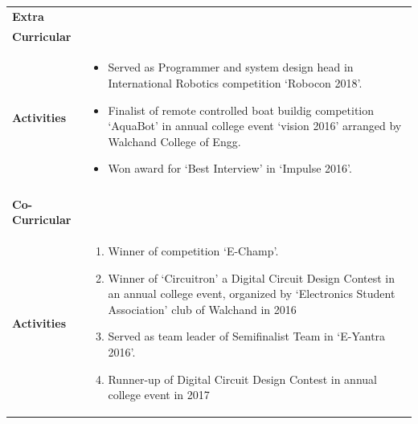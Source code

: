 \documentclass[a4paper,11pt,oneside]{article}
\begin{document}
\begin{tabular}{@{} p{} p{\textwidth}}
     \textbf{\large{Extra}} & \\
     \textbf{\large{Curricular}} & \\
     \textbf{\large{Activities}}
        & \vspace{-4em}
          \begin{itemize}
            \setlength\itemsep{0.1em}
            \item Served as Programmer and system design head in International Robotics competition `Robocon 2018'.
            \item Finalist of remote controlled boat buildig competition `AquaBot' in annual college event `vision 2016' arranged by Walchand College of Engg.
            \item Won award for `Best Interview' in `Impulse 2016'.
        \end{itemize}  \\ \\
     \textbf{\large{Co-Curricular}} & \\
     \textbf{\large{Activities}}
        & \vspace{-3em}
          \begin{enumerate}
            \setlength\itemsep{0.1em}
            \item Winner of  competition `E-Champ'.
            \item Winner of `Circuitron' a Digital Circuit Design Contest in an annual college event, organized by `Electronics Student Association' club of Walchand in 2016
            \item Served as team leader of Semifinalist Team in `E-Yantra 2016'.
            \item Runner-up of Digital Circuit Design Contest in annual college event in 2017
        \end{enumerate}
        \vspace{1em}\\
 \end{tabular}
 
\end{document}
